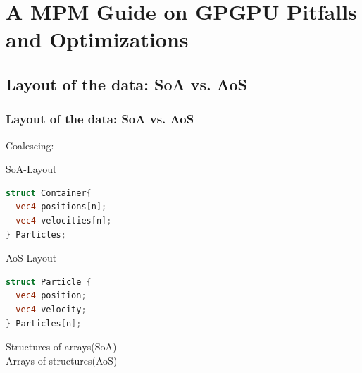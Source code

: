\documentclass{beamer}
\begin{document}
\section{A MPM Guide on GPGPU Pitfalls and Optimizations}
\subsection{Layout of the data: SoA vs. AoS}
\begin{frame}[fragile]
\frametitle{Layout of the data: SoA vs. AoS}

\begin{minipage}{0.31\textwidth}
\begin{minipage}{0.95\textwidth}
Coalescing:
\vspace*{23}
\end{minipage}
\tiny
\begin{minipage}{0.95\textwidth}
  SoA-Layout
\begin{lstlisting}[language={GLSL},style={GL},basicstyle=\tiny]
struct Container{
  vec4 positions[n];
  vec4 velocities[n];
} Particles;
\end{lstlisting}
\vspace*{29}
\end{minipage}
\begin{minipage}{0.95\textwidth}
  AoS-Layout
\begin{lstlisting}[language={GLSL},style={GL},basicstyle=\tiny]
struct Particle {
  vec4 position;
  vec4 velocity;
} Particles[n];
\end{lstlisting}
\end{minipage}
\end{minipage}
\begin{minipage}{0.64\textwidth}
  \tiny
  
  Structures of arrays(SoA)
\\
  
  Arrays of structures(AoS)

\end{minipage}
\end{frame}
\end{document}
